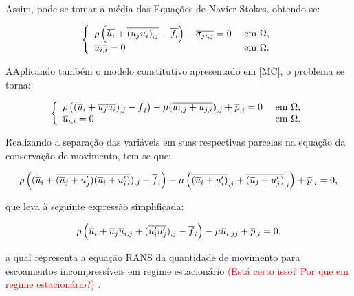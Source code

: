 Assim, pode-se tomar a média das Equações de Navier-Stokes, obtendo-se:

\begin{equation}
    \left\{
    \begin{array}{ll}
        \rho\left({\overline{\dot{u}_i}+\overline{(u_ju_i)_{,j}}-\overline{f_i}}\right)-\overline{\sigma_{ji,j}}=0 & \text{ em }\Omega\text{,} \\
        \overline{u_{i,i}}=0                                                                  & \text{ em }\Omega\text{.}
    \end{array}
    \right.
\end{equation}

AAplicando também o modelo constitutivo apresentado em \ref{MC}, o problema se torna:

\begin{equation}
    \left\{
    \begin{array}{ll}
        \rho\left({(\dot{\overline{u}}_i+\overline{u_ju_i})_{,j}-\overline{f}_i}\right)-\mu(\overline{u_{i,j}+u_{j,i}})_{,j}+\overline{p}_{,i}=0 & \text{ em }\Omega\text{,} \\
        \overline{u}_{i,i}=0                                                                                           & \text{ em }\Omega\text{.}
    \end{array}
    \right.
\end{equation}

Realizando a separação das variáveis em suas respectivas parcelas na equação da conservação de movimento, tem-se que:

\begin{equation}
    \rho\left({(\dot{\overline{u}}_i+\overline{(\overline{u}_j+u'_j)(\overline{u}_i+u'_i)})_{,j}-\overline{f}_i}\right)-\mu\left({\overline{(\overline{u}_i+u'_i)}_{,j}+\overline{(\overline{u}_j+u'_j)}_{,i}}\right)+\overline{p}_{,i}=0\text{,}
\end{equation}

\noindent que leva à seguinte expressão simplificada:

\begin{equation}
    \rho\left({\dot{\overline{u}}_i+\overline{u}_j\overline{u}_{i,j}+(\overline{u'_iu'_j})_{,j}-\overline{f}_i}\right)-\mu\overline{u}_{i,jj}+\overline{p}_{,i}=0\text{,}
    \label{eq:RANS-estac}
\end{equation}

\noindent a qual representa a equação RANS da quantidade de movimento para escoamentos incompressíveis em regime estacionário \textcolor{red}{(Está certo isso? Por que em regime estacionário?)}  \cite{chou1945velocity,alfonsi2009reynolds}.

